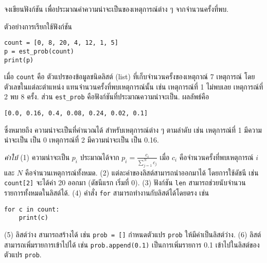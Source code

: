\begin{Exercise}
	\label{prog list prob}
	จงเขียนฟังก์ชัน เพื่อประมาณค่าความน่าจะเป็นของเหตุการณ์ต่าง ๆ จากจำนวนครั้งที่พบ.

ตัวอย่างการเรียกใช้ฟังก์ชัน
\begin{verbatim}
count = [0, 8, 20, 4, 12, 1, 5]
p = est_prob(count)
print(p)
\end{verbatim}
เมื่อ \verb|count| คือ ตัวแปรของข้อมูลชนิดลิสต์ (list) ที่เก็บจำนวนครั้งของเหตุกาณ์ 7 เหตุการณ์ โดย ตัวเลขในแต่ละตำแหน่ง แทนจำนวนครั้งที่พบเหตุการณ์นั้น เช่น เหตุการณ์ที่ 1 ไม่พบเลย เหตุการณ์ที่ 2 พบ 8 ครั้ง. 
ส่วน \verb|est_prob| คือฟังก์ชันที่ประมาณความน่าจะเป็น.
ผลลัพธ์คือ
\begin{verbatim}
[0.0, 0.16, 0.4, 0.08, 0.24, 0.02, 0.1]
\end{verbatim}
ซึ่งหมายถึง
ความน่าจะเป็นที่คำนวณได้ สำหรับเหตุการณ์ต่าง ๆ ตามลำดับ
เช่น เหตุการณ์ที่ 1 มีความน่าจะเป็น เป็น 0
เหตุการณ์ที่ 2 มีความน่าจะเป็น เป็น 0.16.

\textit{คำใบ้}
(1) ความน่าจะเป็น $p_i$ ประมาณได้จาก $p_i = \frac{c_i}{\sum_{j=1}^N c_j}$ เมื่อ $c_i$ คือจำนวนครั้งที่พบเหตุการณ์ $i$ และ $N$ คือจำนวนเหตุการณ์ทั้งหมด.
(2) แต่ละค่าของลิสต์สามารถนำออกมาได้ โดยการใช้ดัชนี เช่น \verb|count[2]| จะได้ค่า 20 ออกมา (ดัชนีแรก เริ่มที่ 0).
(3) ฟังก์ชัน \verb|len| สามารถช่วยนับจำนวนรายการทั้งหมดในลิสต์ได้.
(4) คำสั่ง \verb|for| สามารถทำงานกับลิสต์ได้โดยตรง เช่น 
\begin{verbatim}
for c in count: 
    print(c)
\end{verbatim}
(5) ลิสต์ว่าง สามารถสร้างได้ เช่น \verb|prob = []| กำหนดตัวแปร \verb|prob| ให้มีค่าเป็นลิสต์ว่าง.
(6) ลิสต์ สามารถเพิ่มรายการเข้าไปได้ เช่น \verb|prob.append(0.1)| เป็นการเพิ่มรายการ 0.1 เข้าไปในลิสต์ของตัวแปร \verb|prob|.

\end{Exercise}


